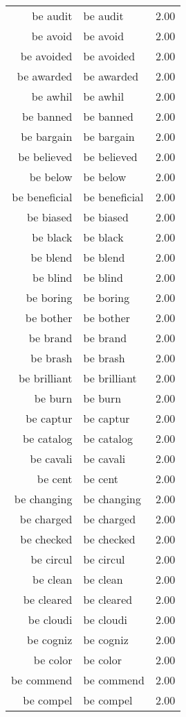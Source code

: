 \begin{table}[ht]
\begin{tabular}{rlr}
  be audit & be audit & 2.00 \\ 
  be avoid & be avoid & 2.00 \\ 
  be avoided & be avoided & 2.00 \\ 
  be awarded & be awarded & 2.00 \\ 
  be awhil & be awhil & 2.00 \\ 
  be banned & be banned & 2.00 \\ 
  be bargain & be bargain & 2.00 \\ 
  be believed & be believed & 2.00 \\ 
  be below & be below & 2.00 \\ 
  be beneficial & be beneficial & 2.00 \\ 
  be biased & be biased & 2.00 \\ 
  be black & be black & 2.00 \\ 
  be blend & be blend & 2.00 \\ 
  be blind & be blind & 2.00 \\ 
  be boring & be boring & 2.00 \\ 
  be bother & be bother & 2.00 \\ 
  be brand & be brand & 2.00 \\ 
  be brash & be brash & 2.00 \\ 
  be brilliant & be brilliant & 2.00 \\ 
  be burn & be burn & 2.00 \\ 
  be captur & be captur & 2.00 \\ 
  be catalog & be catalog & 2.00 \\ 
  be cavali & be cavali & 2.00 \\ 
  be cent & be cent & 2.00 \\ 
  be changing & be changing & 2.00 \\ 
  be charged & be charged & 2.00 \\ 
  be checked & be checked & 2.00 \\ 
  be circul & be circul & 2.00 \\ 
  be clean & be clean & 2.00 \\ 
  be cleared & be cleared & 2.00 \\ 
  be cloudi & be cloudi & 2.00 \\ 
  be cogniz & be cogniz & 2.00 \\ 
  be color & be color & 2.00 \\ 
  be commend & be commend & 2.00 \\ 
  be compel & be compel & 2.00 \\ 

\end{tabular}
\end{table}
